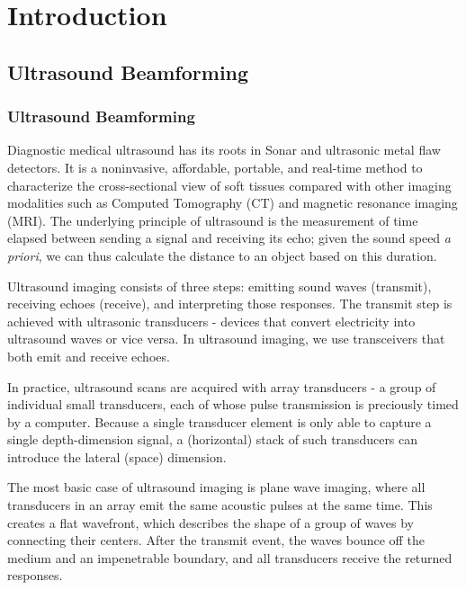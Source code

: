 \chapter{Introduction}

\section{Ultrasound Beamforming}


\subsection{Ultrasound Beamforming}
 Diagnostic medical ultrasound has its roots in Sonar and ultrasonic metal flaw detectors. It is a noninvasive, affordable, portable, and real-time method to characterize the cross-sectional view of soft tissues compared with other imaging modalities such as Computed Tomography (CT) and magnetic resonance imaging (MRI). The underlying principle of ultrasound is the measurement of time elapsed between sending a signal and receiving its echo; given the sound speed \textit{a priori}, we can thus calculate the distance to an object based on this duration.

 Ultrasound imaging consists of three steps: emitting sound waves (transmit), receiving echoes (receive), and interpreting those responses. The transmit step is achieved with ultrasonic transducers - devices that convert electricity into ultrasound waves or vice versa. In ultrasound imaging, we use transceivers that both emit and receive echoes.

 In practice, ultrasound scans are acquired with array transducers - a group of individual small transducers, each of whose pulse transmission is preciously timed by a computer. Because a single transducer element is only able to capture a single depth-dimension signal, a (horizontal) stack of such transducers can introduce the lateral (space) dimension.

 The most basic case of ultrasound imaging is plane wave imaging, where all transducers in an array emit the same acoustic pulses at the same time. This creates a flat wavefront, which describes the shape of a group of waves by connecting their centers. After the transmit event, the waves bounce off the medium and an impenetrable boundary, and all transducers receive the returned responses.

